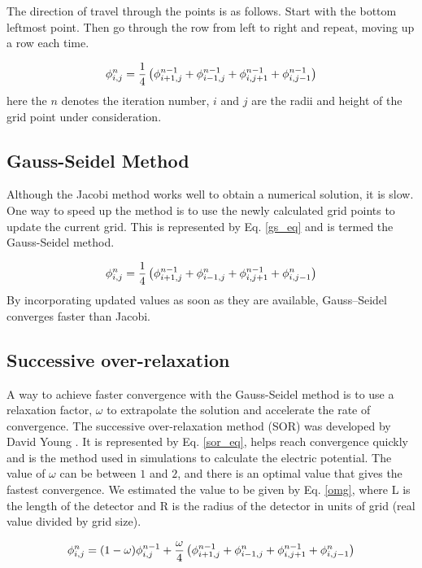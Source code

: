 The direction of travel through the points is as follows. Start with the bottom leftmost point. Then go through the row from left to right and repeat, moving up a row each time.


\begin{equation}{\label{jacobi}}
 \phi_{i,j}^{n} = \frac{1}{4}  \left(\phi^{n-1}_{i+1,j} + \phi^{n-1}_{i-1,j} + \phi^{n-1}_{i,j+1} + \phi^{n-1}_{i,j-1} \right)
\end{equation}
here the $n$ denotes the iteration number, $i$ and $j$ are the radii and height of the grid point under consideration. 

\subsection*{Gauss-Seidel Method}

Although the Jacobi method works well to obtain a numerical solution, it is slow. One way to speed up the method is to use the newly calculated grid points to update the current grid. This is represented by Eq. \ref{gs_eq} and is termed the Gauss-Seidel method.


\begin{equation}{\label{gs_eq}}
 \phi_{i,j}^{n} = \frac{1}{4}  \left(\phi^{n-1}_{i+1,j} + \phi^n_{i-1,j} + \phi^{n-1}_{i,j+1} + \phi^n_{i,j-1} \right)
\end{equation}
By incorporating updated values as soon as they are available, Gauss--Seidel converges faster than Jacobi.

\subsection*{Successive over-relaxation}

A way to achieve faster convergence with the Gauss-Seidel method is to use a relaxation factor, $\omega$ to extrapolate the solution and accelerate the rate of convergence. The successive over-relaxation method (SOR) was developed by David Young \cite{Young1950}. It is represented by Eq. \ref{sor_eq}, helps reach convergence quickly and is the method used in {\siggen} simulations to calculate the electric potential. The value of $\omega$ can be between $1$ and $2$, and there is an optimal value that gives the fastest convergence. We estimated the value to be given by Eq. \ref{omg}, where L is the length of the detector and R is the radius of the detector in units of grid (real value divided by grid size). 

\begin{equation}{\label{sor_eq}}
 \phi_{i,j}^{n} = (1-\omega)\phi^{n-1}_{i,j} + \frac{\omega}{4} \left(\phi^{n-1}_{i+1,j} + \phi^n_{i-1,j} + \phi^{n-1}_{i,j+1} + \phi^n_{i,j-1} \right)
\end{equation}

